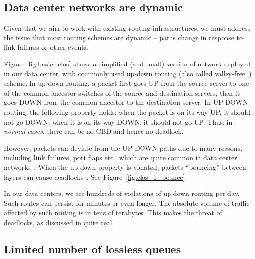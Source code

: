 \subsection{Data center networks are dynamic}\label{sec:reroute}

Given that we aim to work with existing routing infrastructures, we must
address the issue that most routing schemes are dynamic -- paths change in
response to link failures or other events.

Figure~\ref{fig:basic_clos} shows a simplified (and small) version
of network deployed in our data center, with commonly used up-down routing (also
called valley-free~\cite{qiu2007toward}) scheme.  In up-down routing, a packet first
goes UP from the source server to one of the common ancestor switches of the
source and destination servers, then it goes DOWN from the common ancestor to
the destination server.  In UP-DOWN routing, the following property holds: when
the packet is on its way UP, it should not go DOWN; when it is on its way DOWN,
it should not go UP. Thus, in {\em normal cases}, there can be no CBD and hence
no deadlock.

However, packets can deviate from the UP-DOWN paths due to many reasons,
including link failures, port flaps etc., which are quite common in data
center networks~\cite{netpilot,f10}. When the up-down property is violated,
packets ``bouncing'' between layers can cause
deadlocks~\cite{shpiner2016unlocking}. See
Figure~\ref{fig:clos_1_bounce}.

In our data centers, we see hundreds of violations of up-down routing per
day. Such routes can persist for minutes or even longer. %
The absolute volume of traffic affected by such routing is in tens of terabytes. This makes the threat of deadlocks, as discussed
in\cite{rdmaatscale,shpiner2016unlocking,hu2016deadlocks} quite real.

\subsection{Limited number of lossless queues}
\label{subsec:pfcheadroom}

